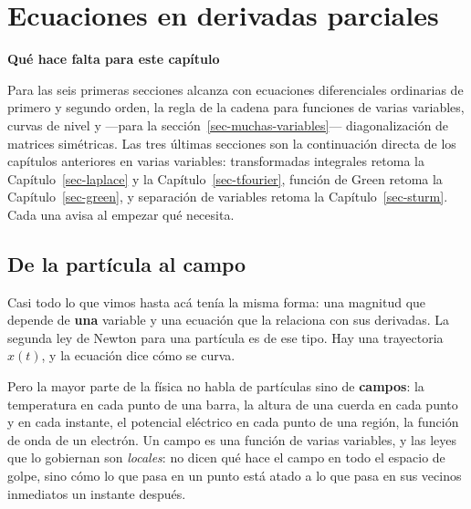 \documentclass[
  spanish,
  a4paper,
]{scrbook}
\theoremstyle{definition}
\theoremstyle{plain}
\theoremstyle{definition}
\theoremstyle{plain}
\theoremstyle{definition}
\theoremstyle{remark}
\begin{document}
\chapter{Ecuaciones en derivadas parciales}\label{sec-edp}

\begin{tcolorbox}[enhanced jigsaw, arc=.35mm, bottomrule=.15mm, breakable, colback=white, colframe=quarto-callout-note-color-frame, left=2mm, leftrule=.75mm, opacityback=0, rightrule=.15mm, toprule=.15mm]
\begin{minipage}[t]{5.5mm}
\textcolor{quarto-callout-note-color}{\faInfo}
\end{minipage}%
\begin{minipage}[t]{\textwidth - 5.5mm}

\vspace{-3mm}\textbf{Qué hace falta para este capítulo}\vspace{3mm}

Para las seis primeras secciones alcanza con ecuaciones diferenciales
ordinarias de primero y segundo orden, la regla de la cadena para
funciones de varias variables, curvas de nivel y ---para la
sección~\ref{sec-muchas-variables}--- diagonalización de matrices
simétricas. Las tres últimas secciones son la continuación directa de
los capítulos anteriores en varias variables: transformadas integrales
retoma la Capítulo~\ref{sec-laplace} y la Capítulo~\ref{sec-tfourier},
función de Green retoma la Capítulo~\ref{sec-green}, y separación de
variables retoma la Capítulo~\ref{sec-sturm}. Cada una avisa al empezar
qué necesita.

\end{minipage}%
\end{tcolorbox}

\section{De la partícula al campo}\label{sec-motivacion}

Casi todo lo que vimos hasta acá tenía la misma forma: una magnitud que
depende de \textbf{una} variable y una ecuación que la relaciona con sus
derivadas. La segunda ley de Newton para una partícula es de ese tipo.
Hay una trayectoria \(x(t)\), y la ecuación dice cómo se curva.

Pero la mayor parte de la física no habla de partículas sino de
\textbf{campos}: la temperatura en cada punto de una barra, la altura de
una cuerda en cada punto y en cada instante, el potencial eléctrico en
cada punto de una región, la función de onda de un electrón. Un campo es
una función de varias variables, y las leyes que lo gobiernan son
\emph{locales}: no dicen qué hace el campo en todo el espacio de golpe,
sino cómo lo que pasa en un punto está atado a lo que pasa en sus
vecinos inmediatos un instante después.
\end{document}

